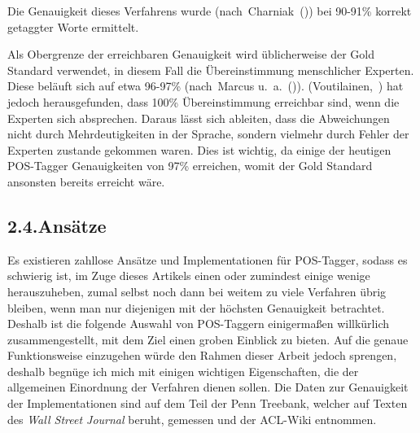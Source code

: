 \documentclass{article}
\begin{document}
Die Genauigkeit dieses Verfahrens wurde (nach~Charniak~()) bei 90-91\% korrekt getaggter Worte ermittelt.%

Als Obergrenze der erreichbaren Genauigkeit wird üblicherweise der Gold Standard verwendet, in diesem Fall die Übereinstimmung menschlicher Experten. Diese beläuft sich auf etwa 96-97\% (nach~Marcus u. a.~()).
(Voutilainen,~) hat jedoch herausgefunden, dass 100\% Übereinstimmung erreichbar sind, wenn die Experten sich absprechen. Daraus lässt sich ableiten, dass die Abweichungen nicht durch Mehrdeutigkeiten in der Sprache, sondern vielmehr durch Fehler der Experten zustande gekommen waren.
Dies ist wichtig, da einige der heutigen POS-Tagger Genauigkeiten von 97\% erreichen, womit der Gold Standard ansonsten bereits erreicht wäre.%

\subsection{2.4.\hspace*{0.5em}Ansätze}\label{sec-anstze}%

\noindent{}Es existieren zahllose Ansätze und Implementationen für POS-Tagger, sodass es schwierig ist, im Zuge dieses Artikels einen oder zumindest einige wenige herauszuheben, zumal selbst noch dann bei weitem zu viele Verfahren übrig bleiben, wenn man nur diejenigen mit der höchsten Genauigkeit betrachtet. Deshalb ist die folgende Auswahl von POS-Taggern einigermaßen willkürlich zusammengestellt, mit dem Ziel einen groben Einblick zu bieten.
Auf die genaue Funktionsweise einzugehen würde den Rahmen dieser Arbeit jedoch sprengen, deshalb begnüge ich mich mit einigen wichtigen Eigenschaften, die der allgemeinen Einordnung der Verfahren dienen sollen.
Die Daten zur Genauigkeit der Implementationen sind auf dem Teil der Penn Treebank, welcher auf Texten des \emph{Wall Street Journal} beruht, gemessen und der ACL-Wiki entnommen.%
\end{document}
